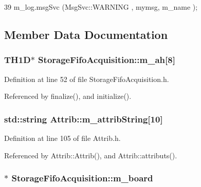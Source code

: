 \begin{DoxyCode}
39 { m_log.msgSvc (MsgSvc::WARNING , mymsg, m_name ); }
\end{DoxyCode}


\subsection{Member Data Documentation}
\hypertarget{classStorageFifoAcquisition_ac73454f960b6224d7fe3d104b4b7a51b}{
\subsubsection[{m\_\-ah}]{\setlength{\rightskip}{0pt plus 5cm}TH1D$\ast$ {\bf StorageFifoAcquisition::m\_\-ah}\mbox{[}8\mbox{]}}}
\label{classStorageFifoAcquisition_ac73454f960b6224d7fe3d104b4b7a51b}


Definition at line 52 of file StorageFifoAcquisition.h.

Referenced by finalize(), and initialize().\hypertarget{classAttrib_a3414521d7a82476e874b25a5407b5e63}{
\subsubsection[{m\_\-attribString}]{\setlength{\rightskip}{0pt plus 5cm}std::string {\bf Attrib::m\_\-attribString}\mbox{[}10\mbox{]}}}
\label{classAttrib_a3414521d7a82476e874b25a5407b5e63}


Definition at line 105 of file Attrib.h.

Referenced by Attrib::Attrib(), and Attrib::attributs().\hypertarget{classStorageFifoAcquisition_a86f825b4740c5dcde26933b6debf452f}{
\subsubsection[{m\_\-board}]{$\ast$ {\bf StorageFifoAcquisition::m\_\-board}}}
\label{classStorageFifoAcquisition_a86f825b4740c5dcde26933b6debf452f}


